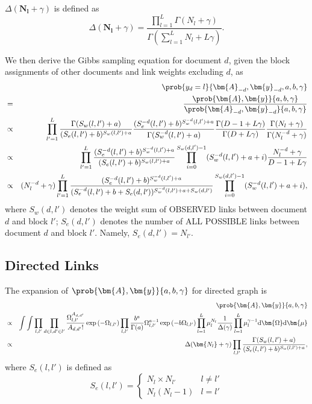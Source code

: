 $\Delta(\bm{N_l}+\gamma)$ is defined as
\begin{equation}
\Delta(\bm{N_l}+\gamma) = \frac {\prod\limits_{l=1}^{L} \Gamma(N_l+\gamma)} {\Gamma(\sum\limits_{l=1}^{L} N_l + L\gamma)}.
\end{equation}

We then derive the Gibbs sampling equation for document $d$, given the block assignments of other documents and link weights excluding $d$, as
\begin{eqnarray}
&&\prob {y_{d}=l} {\bm{A}_{-d}, \bm{y}_{-d}, a, b, \gamma} \\
&=& \frac {\prob {\bm{A}, \bm{y}} {a, b, \gamma}} {\prob {\bm{A}_{-d}, \bm{y}_{-d}} {a, b, \gamma}}\\
&\propto& \prod_{l'=1}^L \frac {\Gamma(S_w (l,l')+a)} {(S_e (l,l')+b)^{S_w (l,l')+a}} \frac {(S_e^{-d} (l,l')+b)^{S_w^{-d} (l,l')+a}} {\Gamma(S_w^{-d} (l,l')+a)} \frac {\Gamma(D-1+L\gamma)} {\Gamma(D+L\gamma)} \frac {\Gamma(N_l+\gamma)} {\Gamma(N_l^{-d}+\gamma)} \\
&\propto& \prod_{l'=1}^L \frac {(S_e^{-d} (l,l')+b)^{S_w^{-d} (l,l')+a}} {(S_e (l,l')+b)^{S_w (l,l')+a}} \prod_{i=0}^{S_w(d,l')-1} (S_w^{-d}(l,l')+a+i) \frac {N_l^{-d}+\gamma} {D-1+L\gamma}\\
&\propto& (N_l^{-d}+\gamma) \prod_{l'=1}^L \frac {(S_e^{-d} (l,l')+b)^{S_w^{-d} (l,l')+a}} {(S_e^{-d} (l,l')+b+ S_e(d,l'))^{S_w^{-d} (l,l')+a+ S_w(d,l')}} \prod_{i=0}^{S_w(d,l')-1} (S_w^{-d}(l,l')+a+i), \label{eq:block_sampling}
\end{eqnarray}
where $S_w(d,l')$ denotes the weight sum of OBSERVED links between document $d$ and block $l'$; $S_e(d,l')$ denotes the number of ALL POSSIBLE links between document $d$ and block $l'$. Namely, $S_e(d,l')=N_{l'}$.

\subsection{Directed Links}
\label{ssec:directed}

The expansion of $\prob {\bm{A}, \bm{y}} {a, b, \gamma}$ for directed graph is
\begin{eqnarray}
&&\prob {\bm{A}, \bm{y}} {a, b, \gamma} \\
&\propto& \int \int \prod_{l,l'} \prod_{d\in l, d' \in l'} \frac {\Omega_{l,l'}^{A_{d,d'}}} {A_{d,d'}!} \exp \left( -\Omega_{l,l'} \right) \prod_{l,l'} \frac {b^a} {\Gamma(a)} \Omega_{l, l'}^{a-1} \exp \left( -b \Omega_{l,l'} \right) \prod_{l=1}^{L} \mu_l^{N_l} \frac {1} {\Delta(\gamma)} \prod_{l=1}^{L} \mu_l^{\gamma-1} \mathrm{d} \bm{\Omega} \mathrm{d} \bm{\mu}\\
&\propto& \Delta(\bm{N_l}+\gamma) \prod_{l,l'} \frac {\Gamma(S_w(l,l')+a)} {(S_e(l,l')+b)^{S_w(l,l')+a}},
\end{eqnarray}
where $S_e(l,l')$ is defined as
\begin{equation}
S_e(l,l')=
\left\{
    \begin{array}{cc}
        N_l\times N_{l'} & l\neq l'\\
        N_l (N_l-1) & l=l'
    \end{array}
\right.
\end{equation}

